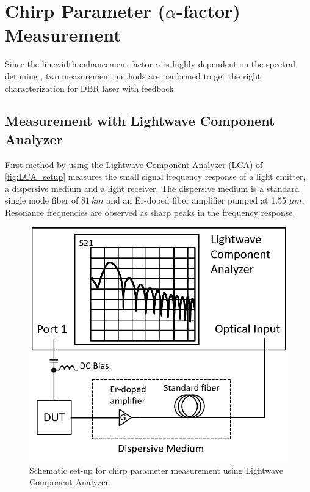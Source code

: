 


\section{Chirp Parameter ($\alpha$-factor) Measurement}\label{sec:chirp_measurement}
Since the linewidth enhancement factor $\alpha$ is highly dependent on the spectral detuning \cite{soriano2013complex}, two measurement methods are performed to get the right characterization for DBR laser with feedback.

\subsection{Measurement with Lightwave Component Analyzer}\label{subsec:measurement_with_LCA}
First method by using the Lightwave Component Analyzer (LCA) of \autoref{fig:LCA_setup} measures the small signal frequency response of a light emitter, a dispersive medium and a light receiver. The dispersive medium is a standard single mode fiber of $81 \ km$ and an Er-doped fiber amplifier pumped at 1.55 $\mu m$. Resonance frequencies are observed as sharp peaks in the frequency response.
\begin{figure}[ht]
    \centering
    \includegraphics[width=.5\linewidth]{figures/LCA_setup.png}
    \caption{Schematic set-up for chirp parameter measurement using Lightwave Component Analyzer.}
    \label{fig:LCA_setup}
\end{figure}

